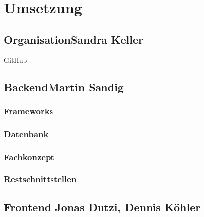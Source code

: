 \chapter{Umsetzung} \label{umsetzung}
	\section[Organisation]{Organisation{\hfill \normalsize Sandra Keller}}
	GitHub
	\section[Backend]{Backend{\hfill \normalsize Martin Sandig}}
	
	\subsection{Frameworks}
	
	\subsection{Datenbank}
	
	\subsection{Fachkonzept}
	
	\subsection{Restschnittstellen}
	
	\section[Frontend]{Frontend {\hfill \normalsize Jonas Dutzi, Dennis Köhler}}
